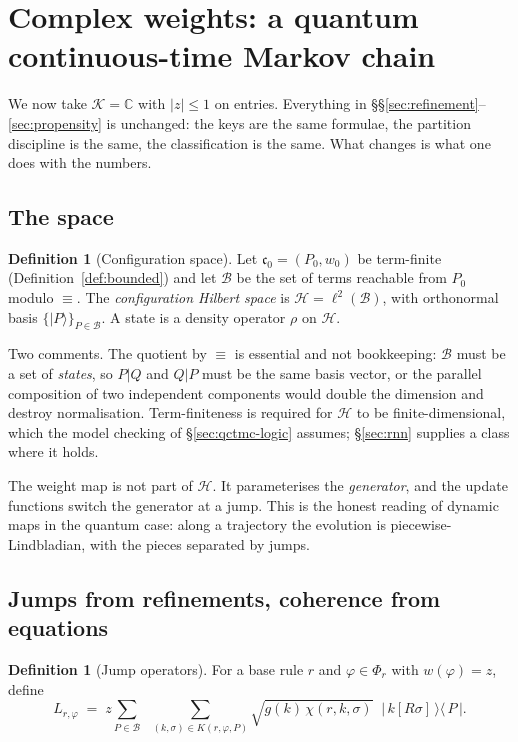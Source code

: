 \documentclass[11pt,a4paper]{article}
\theoremstyle{plain}
\theoremstyle{definition}
\newtheorem{definition}[theorem]{Definition}
\theoremstyle{remark}
\newcommand{\sepc}{\mathbin{\big|}}
\newcommand{\Cx}{\mathbb{C}}
\newcommand{\wmap}{w}
\newcommand{\gfac}{g}
\newcommand{\Lop}{L}
\begin{document}
\section{Complex weights: a quantum continuous-time Markov chain}
\label{sec:quantum}

We now take $\mathcal{K} = \Cx$ with $|z| \le 1$ on entries. Everything in
\S\S\ref{sec:refinement}--\ref{sec:propensity} is unchanged: the keys are the same formulae, the
partition discipline is the same, the classification is the same. What changes is what one does with
the numbers.

\subsection{The space}

\begin{definition}[Configuration space]
\label{def:hilbert}
Let $\mathfrak{c}_0 = (P_0, \wmap_0)$ be term-finite (Definition~\ref{def:bounded}) and let
$\mathcal{B}$ be the set of terms reachable from $P_0$ modulo $\equiv$. The \emph{configuration
Hilbert space} is $\mathcal{H} = \ell^2(\mathcal{B})$, with orthonormal basis $\{|P\rangle\}_{P \in
\mathcal{B}}$. A state is a density operator $\rho$ on $\mathcal{H}$.
\end{definition}

Two comments. The quotient by $\equiv$ is essential and not bookkeeping: $\mathcal{B}$ must be a set
of \emph{states}, so $P \sepc Q$ and $Q \sepc P$ must be the same basis vector, or the parallel
composition of two independent components would double the dimension and destroy normalisation.
Term-finiteness is required for $\mathcal{H}$ to be finite-dimensional, which the model checking of
\S\ref{sec:qctmc-logic} assumes; \S\ref{sec:rnn} supplies a class where it holds.

The weight map is not part of $\mathcal{H}$. It parameterises the \emph{generator}, and the update
functions switch the generator at a jump. This is the honest reading of dynamic maps in the quantum
case: along a trajectory the evolution is piecewise-Lindbladian, with the pieces separated by jumps.

\subsection{Jumps from refinements, coherence from equations}

\begin{definition}[Jump operators]
\label{def:jump}
For a base rule $r$ and $\varphi \in \Phi_r$ with $\wmap(\varphi) = z$, define
\[
\Lop_{r,\varphi} \;=\; z \sum_{P \in \mathcal{B}} \;\; \sum_{(k,\sigma) \in K(r,\varphi,P)}
\sqrt{\gfac(k)\,\chi(r,k,\sigma)} \;\; \big|\,k[R\sigma]\,\big\rangle \big\langle\, P \,\big| .
\]
\end{definition}
\end{document}
